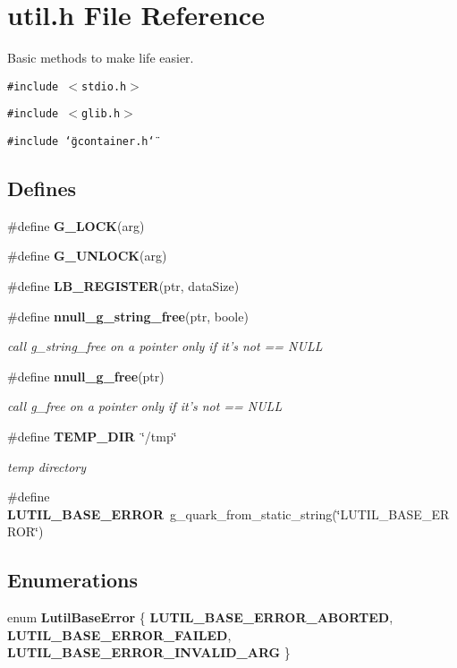 \section{util.h File Reference}
\label{util_8h}
Basic methods to make life easier.  


{\tt \#include $<$stdio.h$>$}\par
{\tt \#include $<$glib.h$>$}\par
{\tt \#include \char`\"{}gcontainer.h\char`\"{}}\par
\subsection*{Defines}
\begin{CompactItemize}
\item 
\#define {\bf G\_\-LOCK}(arg)
\item 
\#define {\bf G\_\-UNLOCK}(arg)
\item 
\#define {\bf LB\_\-REGISTER}(ptr, data\-Size)
\item 
\#define {\bf nnull\_\-g\_\-string\_\-free}(ptr, boole)
\begin{CompactList}\small\item\em call g\_\-string\_\-free on a pointer only if it's not == NULL \item\end{CompactList}\item 
\#define {\bf nnull\_\-g\_\-free}(ptr)
\begin{CompactList}\small\item\em call g\_\-free on a pointer only if it's not == NULL \item\end{CompactList}\item 
\#define {\bf TEMP\_\-DIR}\ \char`\"{}/tmp\char`\"{}
\begin{CompactList}\small\item\em temp directory \item\end{CompactList}\item 
\#define {\bf LUTIL\_\-BASE\_\-ERROR}\ g\_\-quark\_\-from\_\-static\_\-string(\char`\"{}LUTIL\_\-BASE\_\-ERROR\char`\"{})
\end{CompactItemize}
\subsection*{Enumerations}
\begin{CompactItemize}
\item 
enum {\bf Lutil\-Base\-Error} \{ {\bf LUTIL\_\-BASE\_\-ERROR\_\-ABORTED}, 
{\bf LUTIL\_\-BASE\_\-ERROR\_\-FAILED}, 
{\bf LUTIL\_\-BASE\_\-ERROR\_\-INVALID\_\-ARG}
 \}
\end{CompactItemize}

